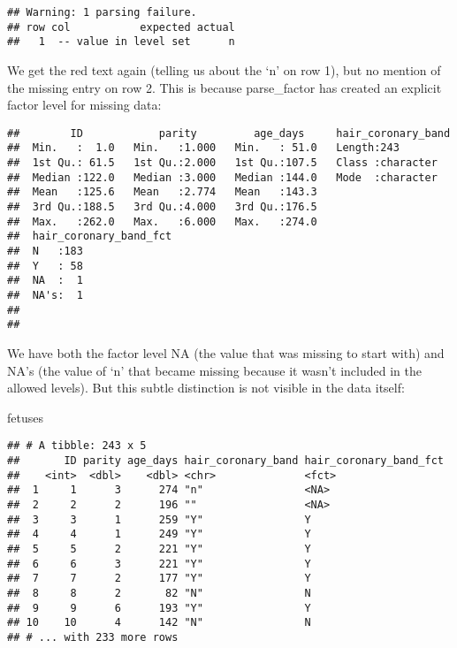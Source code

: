 \documentclass[
]{article}
\newenvironment{Shaded}{\begin{snugshade}}{\end{snugshade}}
\newcommand{\KeywordTok}[1]{\textcolor[rgb]{0.13,0.29,0.53}{\textbf{#1}}}
\newcommand{\NormalTok}[1]{#1}
\newcommand{\OperatorTok}[1]{\textcolor[rgb]{0.81,0.36,0.00}{\textbf{#1}}}
\newcommand{\StringTok}[1]{\textcolor[rgb]{0.31,0.60,0.02}{#1}}
\begin{document}
\begin{verbatim}
## Warning: 1 parsing failure.
## row col           expected actual
##   1  -- value in level set      n
\end{verbatim}

We get the red text again (telling us about the `n' on row 1), but no
mention of the missing entry on row 2. This is because parse\_factor has
created an explicit factor level for missing data:

\begin{Shaded}
\end{Shaded}

\begin{verbatim}
##        ID            parity         age_days     hair_coronary_band
##  Min.   :  1.0   Min.   :1.000   Min.   : 51.0   Length:243        
##  1st Qu.: 61.5   1st Qu.:2.000   1st Qu.:107.5   Class :character  
##  Median :122.0   Median :3.000   Median :144.0   Mode  :character  
##  Mean   :125.6   Mean   :2.774   Mean   :143.3                     
##  3rd Qu.:188.5   3rd Qu.:4.000   3rd Qu.:176.5                     
##  Max.   :262.0   Max.   :6.000   Max.   :274.0                     
##  hair_coronary_band_fct
##  N   :183              
##  Y   : 58              
##  NA  :  1              
##  NA's:  1              
##                        
## 
\end{verbatim}

We have both the factor level NA (the value that was missing to start
with) and NA's (the value of `n' that became missing because it wasn't
included in the allowed levels). But this subtle distinction is not
visible in the data itself:

\begin{Shaded}
\begin{Highlighting}[]
\NormalTok{fetuses}
\end{Highlighting}
\end{Shaded}

\begin{verbatim}
## # A tibble: 243 x 5
##       ID parity age_days hair_coronary_band hair_coronary_band_fct
##    <int>  <dbl>    <dbl> <chr>              <fct>                 
##  1     1      3      274 "n"                <NA>                  
##  2     2      2      196 ""                 <NA>                  
##  3     3      1      259 "Y"                Y                     
##  4     4      1      249 "Y"                Y                     
##  5     5      2      221 "Y"                Y                     
##  6     6      3      221 "Y"                Y                     
##  7     7      2      177 "Y"                Y                     
##  8     8      2       82 "N"                N                     
##  9     9      6      193 "Y"                Y                     
## 10    10      4      142 "N"                N                     
## # ... with 233 more rows
\end{verbatim}
\end{document}
